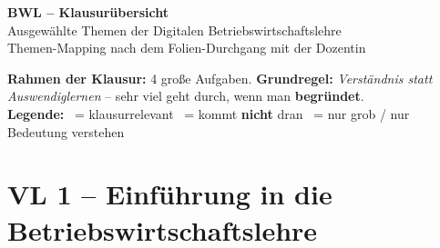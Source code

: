 \documentclass[11pt,a4paper]{article}
\newcommand{\ja}{\textcolor{jagruen}{\ding{51}}}
\newcommand{\nein}{\textcolor{neinrot}{\ding{55}}}
\newcommand{\grob}{\textcolor{groborange}{\ding{115}}}
\begin{document}
\begin{center}
{\Huge\bfseries\color{dhbwrot} BWL -- Klausurübersicht}\\[4pt]
{\large Ausgewählte Themen der Digitalen Betriebswirtschaftslehre}\\[2pt]
{\normalsize Themen-Mapping nach dem Folien-Durchgang mit der Dozentin}
\end{center}

\vspace{4pt}

\begin{tcolorbox}[colback=dhbwrot!6,colframe=dhbwrot,boxrule=0.8pt,arc=2pt]
\textbf{Rahmen der Klausur:} 4 große Aufgaben. \quad
\textbf{Grundregel:} \emph{Verständnis statt Auswendiglernen} --
\glqq sehr viel geht durch, wenn man \textbf{begründet}\grqq.\\[4pt]
\textbf{Legende:}\quad
\ja~= klausurrelevant \quad
\nein~= kommt \textbf{nicht} dran \quad
\grob~= nur grob / nur Bedeutung verstehen
\end{tcolorbox}

\vspace{6pt}

\section*{}
\section{VL 1 -- Einführung in die Betriebswirtschaftslehre}
\end{document}
